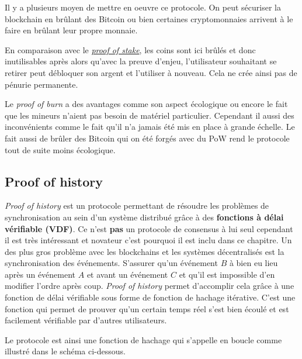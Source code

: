 Il y a plusieurs moyen de mettre en oeuvre ce protocole. On peut sécuriser la blockchain en brûlant des Bitcoin ou bien certaines cryptomonnaies arrivent à le faire en brûlant leur propre monnaie.

En comparaison avec le \hyperref[consensus:pos]{\emph{proof of stake}}, les coins sont ici brûlés et donc inutilisables après alors qu'avec la preuve d'enjeu, l'utilisateur souhaitant se retirer peut débloquer son argent et l'utiliser à nouveau. Cela ne crée ainsi pas de pénurie permanente.

Le \emph{proof of burn} a des avantages comme son aspect écologique ou encore le fait que les mineurs n'aient pas besoin de matériel particulier. Cependant il aussi des inconvénients comme le fait qu'il n'a jamais été mis en place à grande échelle. Le fait aussi de brûler des Bitcoin qui on été forgés avec du PoW rend le protocole tout de suite moins écologique.

\subsection{Proof of history}

\emph{Proof of history} \cite{proof:poh} est un protocole permettant de résoudre les problèmes de synchronisation au sein d'un système distribué grâce à des \textbf{fonctions à délai vérifiable (VDF)}. Ce n'est \textbf{pas} un protocole de consensus à lui seul cependant il est très intéressant et novateur c'est pourquoi il est inclu dans ce chapitre. Un des plus gros problème avec les blockchains et les systèmes décentralisés est la synchronisation des événements. S'assurer qu'un événement $B$ à bien eu lieu après un événement $A$ et avant un événement $C$ et qu'il est impossible d'en modifier l'ordre après coup. \emph{Proof of history} permet d'accomplir cela grâce à une fonction de délai vérifiable sous forme de fonction de hachage itérative. C'est une fonction qui permet de prouver qu'un certain temps réel s'est bien écoulé et est facilement vérifiable par d'autres utilisateurs.

Le protocole est ainsi une fonction de hachage qui s'appelle en boucle comme illustré dans le schéma ci-dessous.

